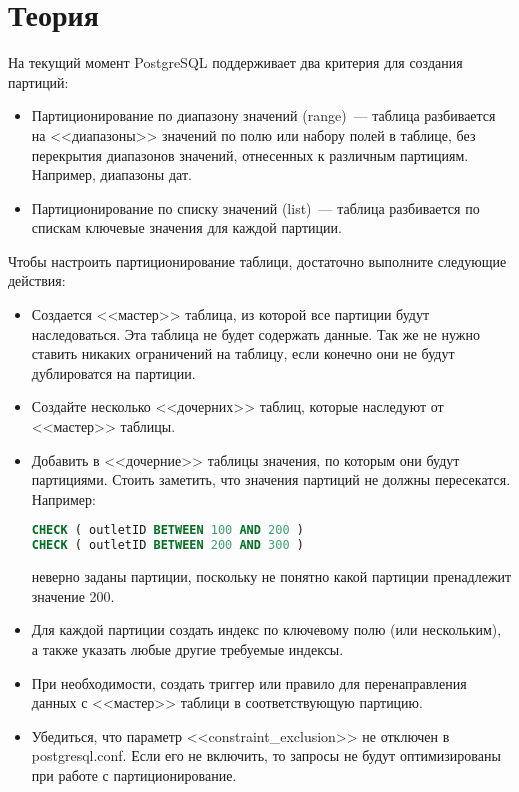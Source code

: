 \section{Теория}
На текущий момент PostgreSQL поддерживает два критерия для создания партиций:
\begin{itemize}
\item Партиционирование по диапазону значений (range)~--- таблица разбивается на <<диапазоны>> значений по полю или набору полей 
в таблице, без перекрытия диапазонов значений, отнесенных к различным партициям. Например, диапазоны дат.
\item Партиционирование по списку значений (list)~--- таблица разбивается по спискам ключевые значения для каждой партиции.
\end{itemize}

Чтобы настроить партиционирование таблици, достаточно выполните следующие действия:
\begin{itemize}
\item Создается <<мастер>> таблица, из которой все партиции будут наследоваться. Эта таблица не будет содержать данные. 
Так же не нужно ставить никаких ограничений на таблицу, если конечно они не будут дублироватся на партиции.
\item Создайте несколько <<дочерних>> таблиц, которые наследуют от <<мастер>> таблицы. 
\item Добавить в <<дочерние>> таблицы значения, по которым они будут партициями. 
Стоить заметить, что значения партиций не должны пересекатся. Например:
\begin{lstlisting}[language=SQL,label=lst:partitioning1,caption=Пример неверного задлания значений партиций]
CHECK ( outletID BETWEEN 100 AND 200 )
CHECK ( outletID BETWEEN 200 AND 300 )
\end{lstlisting}
неверно заданы партиции, поскольку не понятно какой партиции пренадлежит значение 200. 
\item Для каждой партиции создать индекс по ключевому полю (или нескольким), а также указать любые другие требуемые индексы.
\item При необходимости, создать триггер или правило для перенаправления данных с <<мастер>> таблици в соответствующую партицию.
\item Убедиться, что параметр <<constraint\_exclusion>> не отключен в postgresql.conf. Если его не включить, то запросы не будут 
оптимизированы при работе с партиционирование.
\end{itemize}

